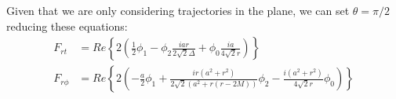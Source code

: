 \documentclass[preprint,showpacs,preprintnumbers,amssymb,superscriptaddress,aps,prd,nofootinbib,11pt]{revtex4-1}
\begin{document}
Given that we are only considering trajectories in the plane, we can set $\theta = \pi/2$ reducing these equations:
\begin{align}
    F_{rt} &=Re \left\{ 2 \left( \frac{1}{2}\phi_1 - \phi_2  \frac{i a r}{2 \sqrt{2} \Delta} + \phi_0\frac{i a}{4 \sqrt{2} r}\right)\right \}\\
    F_{r\phi} &= Re\left\{2 \left(-\frac{a}{2} \phi_1 +\frac{i r \left(a^2+r^2\right)}{2 \sqrt{2} \left(a^2+r (r-2 M)\right)} \phi_2 -\frac{i \left(a^2+r^2\right)}{4 \sqrt{2} r}\phi_0\right)\right\}
\end{align}


\end{document}
